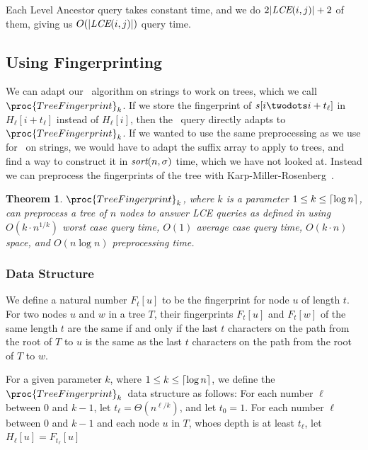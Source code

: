 \documentclass[a4]{article}
\newcommand*{\pref}{\prettyref}
\newtheorem{theorem}{Theorem}
\begin{document}
Each Level Ancestor query takes constant time, and we do $2|\textit{LCE}(i,j)| + 2$ of them, giving us $O(|\textit{LCE}(i,j)|)$ query time.

\subsection{Using Fingerprinting}

\newcommand{\tfprint}[1][k]{\ensuremath{\proc{TreeFingerprint}_{#1}}}
\newcommand{\tfprintk}{\tfprint[k]}

We can adapt our \fprintk\ algorithm on strings to work on trees, which we call \tfprintk. If we store the fingerprint of $s[i\twodots i+t_\ell]$ in $H_\ell[i+t_\ell]$ instead of $H_\ell[i]$, then the \fprintk\ query directly adapts to \tfprintk. If we wanted to use the same preprocessing as we use for \fprintk\ on strings, we would have to adapt the suffix array to apply to trees, and find a way to construct it in $\textit{sort}(n,\sigma)$ time, which we have not looked at. Instead we can preprocess the fingerprints of the tree with Karp-Miller-Rosenberg~\cite{karp-miller-rosenberg}.

\begin{theorem}
\tfprintk, where $k$ is a parameter $1\leq k\leq\lceil\log n\rceil$, can preprocess a tree of $n$ nodes to answer LCE queries as defined in \pref{sec:tree-def} using $O(k\cdot n^{1/k})$ worst case query time, $O(1)$ average case query time, $O(k\cdot n)$ space, and $O(n\log n)$ preprocessing time.
\end{theorem}

\subsubsection{Data Structure}

We define a natural number $F_t[u]$ to be the fingerprint for node $u$ of length $t$. For two nodes $u$ and $w$ in a tree $T$, their fingerprints $F_t[u]$ and $F_t[w]$ of the same length $t$ are the same if and only if the last $t$ characters on the path from the root of $T$ to $u$ is the same as the last $t$ characters on the path from the root of $T$ to $w$.

For a given parameter $k$, where $1\leq k \leq \lceil\log n\rceil$, we define the \tfprintk\ data structure as follows: For each number $\ell$ between $0$ and $k-1$, let $t_\ell=\Theta(n^{\ell/k})$, and let $t_0 = 1$. For each number $\ell$ between $0$ and $k-1$ and each node $u$ in $T$, whoes depth is at least $t_\ell$, let $H_\ell[u] = F_{t_\ell}[u]$
\end{document}
